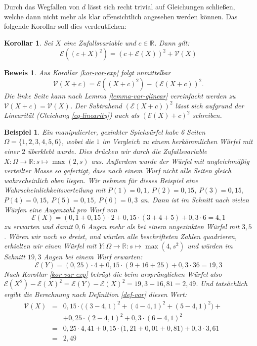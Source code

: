 \documentclass[a4paper]{article}
\newtheorem{korollar}[satz]{Korollar}
\newtheorem{beispiel}[satz]{Beispiel}
\theoremstyle{nonumberplain}
\newtheorem{beweis}{Beweis}
\begin{document}
Durch das Wegfallen von $d$ lässt sich recht trivial auf Gleichungen schließen, welche dann nicht mehr als klar offensichtlich angesehen werden können. Das folgende Korollar soll dies verdeutlichen:
\begin{korollar}
	Sei $X$ eine Zufallsvariable und $c \in \mathbb{R}$. Dann gilt:
	\begin{equation}
		\mathcal{E}\left((c+X)^2\right) = (c+ \mathcal{E}(X))^2 + \mathcal{V}(X)
	\end{equation}
\end{korollar}
\begin{beweis}
Aus Korollar \ref{kor-var-exp} folgt unmittelbar \[\mathcal{V}(X+c) = \mathcal{E}\left((X+c)^{2}\right) - \left(\mathcal{E}\left(X+c\right)\right)^{2}\text{.}\] Die linke Seite kann nach Lemma \ref{lemma-var-qlinear} vereinfacht werden zu $\mathcal{V}(X+c) = \mathcal{V}(X)$. Der Subtrahend $\left(\mathcal{E}\left(X+c\right)\right)^{2}$ lässt sich aufgrund der Linearität (Gleichung \ref{eq-linearity}) auch als $\left( \mathcal{E}(X)+c\right)^{2}$ 
schreiben.
\end{beweis}

\begin{beispiel}
	Ein manipulierter, gezinkter Spielwürfel habe 6 Seiten $\Omega = \{1,2,3,4,5,6\}$, wobei die $1$ im Vergleich zu einem herkömmlichen Würfel mit einer $2$ überklebt wurde. Dies drücken wir durch die Zufallsvariable $X : \Omega \to \mathbb{R} : s \mapsto \max(2,s)$ aus.	Außerdem wurde der Würfel mit ungleichmäßig verteilter Masse so gefertigt, dass nach einem Wurf nicht alle Seiten gleich wahrscheinlich oben liegen. Wir nehmen für dieses Beispiel eine Wahrscheinlichkeitsverteilung mit $P(1)=0,1$, $P(2)=0,15$, $P(3)=0,15$, $P(4)=0,15$, $P(5)=0,15$, $P(6)=0,3$ an.
	Dann ist im Schnitt nach vielen Würfen eine Augenzahl pro Wurf von
	\[
		\mathcal{E}(X) = (0,1 + 0,15) \cdot 2 + 0,15 \cdot (3 + 4 + 5) + 0,3 \cdot 6 = 4,1
	\]
	zu erwarten und damit $0,6$ Augen mehr als bei einem ungezinkten Würfel mit \expect{} $3,5$. Wären wir noch so dreist, und würden alle beschrifteten Zahlen quadrieren, erhielten wir einen Würfel mit $Y : \Omega \to \mathbb{R} : s \mapsto \max(4, s^2)$ und würden im Schnitt $19,3$ Augen bei einem Wurf erwarten:
	\[
		\mathcal{E}(Y) = (0,25) \cdot 4 + 0,15 \cdot (9 + 16 + 25) + 0,3 \cdot 36 = 19,3
	\]
	Nach Korollar \ref{kor-var-exp} beträgt die \var{} beim ursprünglichen Würfel also $\mathcal{E}(X^2) - \mathcal{E}(X)^2 = \mathcal{E}(Y) - \mathcal{E}(X)^2 = 19,3 - 16,81 = 2,49$. Und tatsächlich ergibt die Berechnung nach Definition \ref{def-var} diesen Wert:
	\begin{align*}
	\mathcal{V}(X) & = & 0,15 \cdot \big((3- 4,1)^2 + (4-4,1)^2 + (5-4,1)^2\big) + && \\
	& & + 0,25 \cdot (2 - 4,1)^2 + 0,3 \cdot (6-4,1)^2 && \\
	& = & 0,25 \cdot 4,41 + 0,15 \cdot \big(1,21 + 0,01 + 0,81\big) + 0,3 \cdot 3,61 && \\
	& = & 2,49 &&
	\end{align*}
\end{beispiel}
\end{document}
